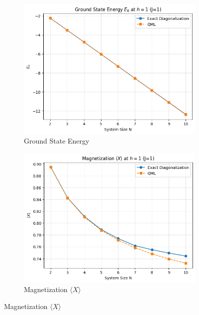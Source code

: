 \documentclass[pre,twocolumn,floatfix]{revtex4-1}
\begin{document}
\begin{figure}[htbp]
    \centering
    \begin{subfigure}[b]{0.32\textwidth} %
        \centering
        \includegraphics[width=\linewidth]{images/cmp_E.png} %
        \caption{Ground State Energy}
        \label{(a)}
    \end{subfigure}
    \hfill %
    \begin{subfigure}[b]{0.32\textwidth}
        \centering
        \includegraphics[width=\linewidth]{images/cmp_X.png} %
        \caption{Magnetization $\langle X \rangle$}

\end{subfigure}
\end{figure}
\end{document}
